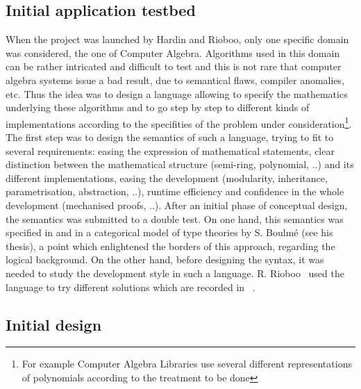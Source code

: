 \subsection*{Initial application testbed}

 When the {\foc} project was launched by Hardin and Rioboo,
only one specific domain was considered, the one of Computer
Algebra. Algorithms used in this domain can be rather intricated and
difficult to test and this is not rare that computer algebra systems
issue a bad result, due to semantical flaws, compiler anomalies,
etc. Thus the idea was to design a language allowing to specify the
mathematics underlying these algorithms and to go step by step to
different kinds of implementations according to the specifities of the
problem under consideration\footnote{For example Computer Algebra
Libraries use several different representations of polynomials
according to the treatment to be done}. The first step was to design
the semantics of such a language, trying to fit to several
requirements: easing the expression of mathematical statements, clear
distinction between the mathematical structure (semi-ring, polynomial,
..)  and its different implementations, easing the development
(modularity, inheritance, parametrisation, abstraction, ..), runtime
efficiency and confidence in the whole development (mechanised proofs,
..).  After an initial phase of conceptual design, the {\foc}
semantics was submitted to a double test. On one hand, this semantics
was specified in {\coq} and in a categorical model of type theories by
S. Boulm\'e (see his thesis\cite{BoulmePhD00}), a point which
enlightened the borders of this approach, regarding the logical
background. On the other hand, before designing the syntax, it was
needed to study the development style in such a
language. R. Rioboo~\cite{ThRRCalculemus,HardinRiobooTSI04} used the
{\ocaml} language to try different solutions which are recorded in
~\cite{HardinRiobooTSI04}.

\subsection*{Initial {\oldfocal} design}

